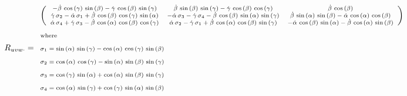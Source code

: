 \[
\scriptsize
R_{uvw \cdot} = 
\begin{array}{l}
	\left(\begin{array}{ccc}
		-\dot{\beta} \,\cos \left(\gamma \right)\,\sin \left(\beta \right) - \dot{\gamma} \,\cos \left(\beta \right)\,\sin \left(\gamma \right) & \dot{\beta} \,\sin \left(\beta \right)\,\sin \left(\gamma \right) - \dot{\gamma} \,\cos \left(\beta \right)\,\cos \left(\gamma \right) & \dot{\beta} \,\cos \left(\beta \right) \\
		\dot{\gamma} \,\sigma_2 - \dot{\alpha} \,\sigma_1 + \dot{\beta} \,\cos \left(\beta \right)\,\cos \left(\gamma \right)\,\sin \left(\alpha \right) & -\dot{\alpha} \,\sigma_3 - \dot{\gamma} \,\sigma_4 - \dot{\beta} \,\cos \left(\beta \right)\,\sin \left(\alpha \right)\,\sin \left(\gamma \right) & \dot{\beta} \,\sin \left(\alpha \right)\,\sin \left(\beta \right) - \dot{\alpha} \,\cos \left(\alpha \right)\,\cos \left(\beta \right) \\
		\dot{\alpha} \,\sigma_4 + \dot{\gamma} \,\sigma_3 - \dot{\beta} \,\cos \left(\alpha \right)\,\cos \left(\beta \right)\,\cos \left(\gamma \right) & \dot{\alpha} \,\sigma_2 - \dot{\gamma} \,\sigma_1 + \dot{\beta} \,\cos \left(\alpha \right)\,\cos \left(\beta \right)\,\sin \left(\gamma \right) & -\dot{\alpha} \,\cos \left(\beta \right)\,\sin \left(\alpha \right) - \dot{\beta} \,\cos \left(\alpha \right)\,\sin \left(\beta \right)
	\end{array}\right)\\
	\\
	\text{where}\\
	\\
	\sigma_1 = \sin \left(\alpha \right)\,\sin \left(\gamma \right) - \cos \left(\alpha \right)\,\cos \left(\gamma \right)\,\sin \left(\beta \right)\\
	\\
	\sigma_2 = \cos \left(\alpha \right)\,\cos \left(\gamma \right) - \sin \left(\alpha \right)\,\sin \left(\beta \right)\,\sin \left(\gamma \right)\\
	\\
	\sigma_3 = \cos \left(\gamma \right)\,\sin \left(\alpha \right) + \cos \left(\alpha \right)\,\sin \left(\beta \right)\,\sin \left(\gamma \right)\\
	\\
	\sigma_4 = \cos \left(\alpha \right)\,\sin \left(\gamma \right) + \cos \left(\gamma \right)\,\sin \left(\alpha \right)\,\sin \left(\beta \right)
\end{array}
\]


